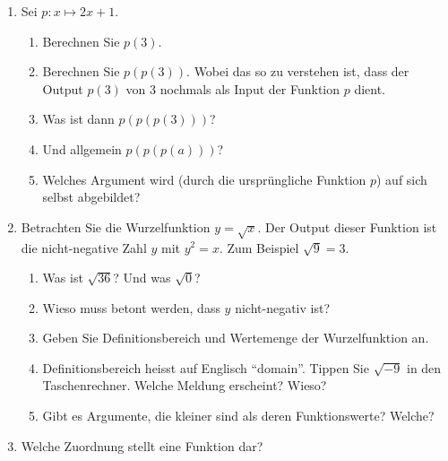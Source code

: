 \begin{ueb}
\begin{enumerate}
        \item Sei \(p\colon x\mapsto 2x+1\).

              \begin{enumerate}
                  \item Berechnen Sie \(p(3)\).
                  \item Berechnen Sie \(p(p(3))\). Wobei das so zu verstehen ist,
                        dass der Output \(p(3)\) von \(3\) nochmals als Input
                        der Funktion \(p\) dient.
                  \item Was ist dann \(p(p(p(3)))\)?
                  \item Und allgemein \(p(p(p(a)))\)?
                  \item Welches Argument wird (durch die ursprüngliche
                        Funktion \(p\)) auf sich selbst abgebildet?
              \end{enumerate}

        \item Betrachten Sie die Wurzelfunktion \(y=\sqrt{x}\).
              Der Output dieser Funktion ist die nicht-negative Zahl \(y\)
              mit \(y^2=x\). Zum Beispiel \(\sqrt{9}=3\).

              \begin{enumerate}
                  \item Was ist \(\sqrt{36}\)? Und was \(\sqrt{0}\)?
                  \item Wieso muss betont werden, dass \(y\) nicht-negativ ist?
                  \item Geben Sie Definitionsbereich und Wertemenge
                        der Wurzelfunktion an.
                  \item Definitionsbereich heisst auf Englisch \enquote{domain}.
                        Tippen Sie \(\sqrt{-9}\) in den Taschenrechner.
                        Welche Meldung erscheint? Wieso?
                  \item Gibt es Argumente, die kleiner sind als deren
                        Funktionswerte? Welche?
              \end{enumerate}


        \item Welche Zuordnung stellt eine Funktion dar?

              \begin{center}
                  \begin{tikzpicture}[
                          >=stealth,
                          punkt/.style={circle, fill=black, inner sep=1.5pt},
                          pfeil/.style={->, thin},
                          beschriftung/.style={font=\small}
                      ]


\end{tikzpicture}
\end{center}
\end{enumerate}
\end{ueb}
